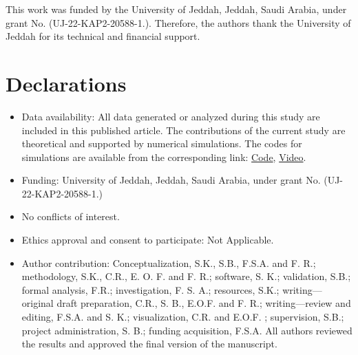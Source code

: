 \documentclass[sn-mathphys-num]{sn-jnl}
\theoremstyle{thmstyleone}%
\theoremstyle{thmstyletwo}%
\theoremstyle{thmstylethree}%
\begin{document}
\backmatter



This work was funded by the University of Jeddah, Jeddah, Saudi Arabia, under grant No. (UJ-22-KAP2-20588-1.). Therefore, the authors thank the University of Jeddah for its technical and financial support.

\section*{Declarations}

\begin{itemize}
\item Data availability: All data generated or analyzed during this study are included in this published article. The contributions of the current study are theoretical and supported by numerical simulations. The codes for simulations are available from the corresponding link:
\href{https://github.com/cdrosales84/uav-payload-asta-validation}{Code},
\href{https://youtu.be/G8a1F97qs_E?si=gQIMWdCDfgZr-XQR}{Video}. 
\item Funding: University of Jeddah, Jeddah, Saudi Arabia, under grant No. (UJ-22-KAP2-20588-1.)
\item No conflicts of interest.
\item Ethics approval and consent to participate: Not Applicable.
\item Author contribution:  
Conceptualization, S.K., S.B., F.S.A. and F. R.; methodology, S.K., C.R., E. O. F. and F. R.; software, S. K.; validation, S.B.; formal analysis, F.R.; investigation, F. S. A.; resources, S.K.; writing—original draft preparation, C.R., S. B., E.O.F. and F. R.; writing—review and editing, F.S.A. and S. K.; visualization, C.R. and E.O.F. ; supervision, S.B.; project administration, S. B.; funding acquisition, F.S.A. All authors reviewed the results and approved the final version of the manuscript.
\end{itemize}



%



\end{document}
